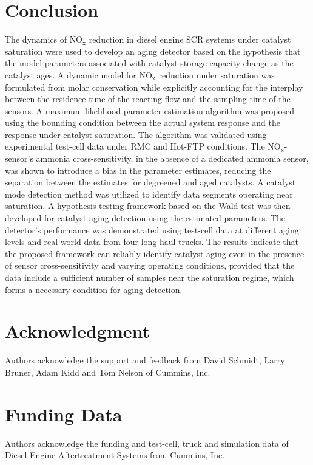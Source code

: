\documentclass[subscriptcorrection,upint,varvw,barcolor=Goldenrod3,mathalfa=cal=euler,balance,hyphenate,french,pdf-a]{asmejour}
\newcommand{\nox}{\text{NO}_{\text{x}}}
\begin{document}
\section{Conclusion}
The dynamics of $\nox$ reduction in diesel engine SCR systems under catalyst saturation were used to develop an aging
detector based on the hypothesis that the model parameters associated with catalyst storage capacity change as the
catalyst ages. A dynamic model for $\nox$ reduction under saturation was formulated from molar conservation while
explicitly accounting for the interplay between the residence time of the reacting flow and the sampling time of the
sensors. A maximum-likelihood parameter estimation algorithm was proposed using the bounding condition between the
actual system response and the response under catalyst saturation. The algorithm was validated using experimental
test-cell data under RMC and Hot-FTP conditions. The $\nox$-sensor's ammonia cross-sensitivity, in the absence of a
dedicated ammonia sensor, was shown to introduce a bias in the parameter estimates, reducing the separation between the
estimates for degreened and aged catalysts. A catalyst mode detection method was utilized to identify data segments
operating near saturation. A hypothesis-testing framework based on the Wald test was then developed for catalyst aging
detection using the estimated parameters. The detector's performance was demonstrated using test-cell data at different
aging levels and real-world data from four long-haul trucks. The results indicate that the proposed framework can
reliably identify catalyst aging even in the presence of sensor cross-sensitivity and varying operating conditions,
provided that the data include a sufficient number of samples near the saturation regime, which forms a necessary
condition for aging detection.

\section*{Acknowledgment}
Authors acknowledge the support and feedback from David Schmidt, Larry Bruner, Adam Kidd and Tom Nelson of Cummins, Inc.
\section*{Funding Data}
Authors acknowledge the funding and test-cell, truck and simulation data of Diesel Engine Aftertreatment Systems from Cummins, Inc.
\end{document}
